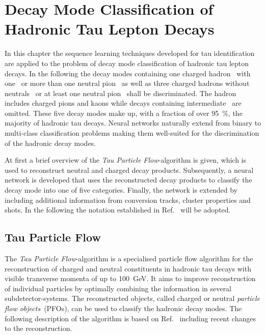 \chapter{Decay Mode Classification of Hadronic Tau Lepton Decays}
\label{sec:decaymode}

In this chapter the sequence learning techniques developed for
tau identification are applied to the problem of decay mode classification of
hadronic tau lepton decays. In the following the decay modes containing one
charged hadron~ with one~ or more than one
neutral pion~ as well as three charged hadrons
without neutrals~ or at least one neutral
pion~ shall be discriminated. The
hadron~ includes charged pions and kaons while decays containing
intermediate~ are omitted. These five decay modes make up,
with a fraction of over \SI{95}{\percent}, the majority of hadronic tau decays.
Neural networks naturally extend from binary to multi-class classification
problems making them well-suited for the discrimination of the hadronic decay
modes.

At first a brief overview of the \emph{Tau Particle Flow}-algorithm is given,
which is used to reconstruct neutral and charged decay products. Subsequently, a
neural network is developed that uses the reconstructed decay products to
classify the decay mode into one of five categories. Finally, the network is
extended by including additional information from conversion tracks, cluster
properties and shots. In the following the notation established in
Ref.~\cite{atlas:taurec:decaymodes} will be adopted. 

\section{Tau Particle Flow}
\label{sec:tau_pflow}

The \emph{Tau Particle Flow}-algorithm is a specialised particle flow algorithm
for the reconstruction of charged and neutral constituents in hadronic tau
decays with visible transverse momenta of up to \SI{100}{\giga\electronvolt}. It
aims to improve reconstruction of individual particles by optimally combining
the information in several subdetector-systems. The reconstructed objects,
called charged or neutral \emph{particle flow objects}~(PFOs), can be used to
classify the hadronic decay modes. The following description of the algorithm is
based on Ref.~\cite{atlas:taurec:decaymodes} including recent changes to the
reconstruction.

